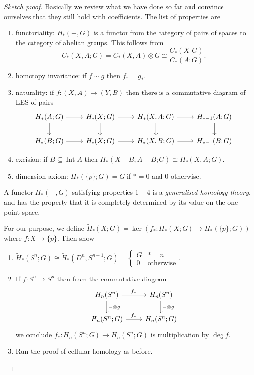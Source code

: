 \documentclass[a4paper]{article}
\DeclareMathOperator{\Int}{Int} %
\begin{document}
\begin{proof}[Sketch proof]
  Basically we review what we have done so far and convince ourselves that they still hold with coefficients. The list of properties are
  \begin{enumerate}
  \item functoriality: \(H_*(-, G)\) is a functor from the category of pairs of spaces to the category of abelian groups. This follows from
    \[
      C_*(X, A; G) = C_*(X, A) \otimes G \cong \frac{C_*(X; G)}{C_*(A; G)}.
    \]
  \item homotopy invariance: if \(f \sim g\) then \(f_* = g_*\).
  \item naturality: if \(f: (X, A) \to (Y, B)\) then there is a commutative diagram of LES of pairs
    \[
      \begin{tikzcd}
        H_*(A; G) \ar[r] \ar[d] & H_*(X; G) \ar[r] \ar[d] & H_*(X, A; G) \ar[r] \ar[d] & H_{* - 1}(A; G) \ar[d] \\
        H_*(B; G) \ar[r] & H_*(X; G) \ar[r] & H_*(X, B; G) \ar[r] & H_{* - 1}(B; G)
      \end{tikzcd}
    \]
  \item excision: if \(\overline B \subseteq \Int A\) then \(H_*(X - B, A - B; G) \cong H_*(X, A; G)\).
  \item dimension axiom: \(H_*(\{p\}; G) = G\) if \(* = 0\) and \(0\) otherwise.
  \end{enumerate}
  A functor \(H_*(-, G)\) satisfying properties 1 -- 4 is a \emph{generalised homology theory}, and has the property that it is completely determined by its value on the one point space.

  For our purpose, we define \(\widetilde H_*(X; G) = \ker(f_*: H_*(X; G) \to H_*(\{p\}; G))\) where \(f: X \to \{p\}\). Then show
  \begin{enumerate}
  \item \(\widetilde H_*(S^n; G) \cong \widetilde H_*(D^n, S^{n - 1}; G) =
    \begin{cases}
      G & * = n \\
      0 & \text{otherwise}
    \end{cases}
    \).
  \item If \(f: S^n \to S^n\) then from the commutative diagram
    \[
      \begin{tikzcd}
        H_n(S^n) \ar[r, "f_*"] \ar[d, "- \otimes g"] & H_n(S^n) \ar[d, "- \otimes g"] \\
        H_n(S^n; G) \ar[r, "f_*"] & H_n(S^n; G)
      \end{tikzcd}
    \]
    we conclude \(f_*: H_n(S^n; G) \to H_n(S^n; G)\) is multiplication by \(\deg f\).
  \item Run the proof of cellular homology as before.
  \end{enumerate}
\end{proof}
\end{document}
